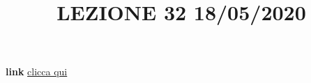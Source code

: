 \newline
\newline
\title{LEZIONE 32 18/05/2020}\newline
\textbf{link} \href{https://web.microsoftstream.com/video/6e8b603a-46e9-4003-83e0-2f8980ac83d8?list=user&userId=faa91214-a6f5-40d7-8875-253fd49b8ce1}{clicca qui}